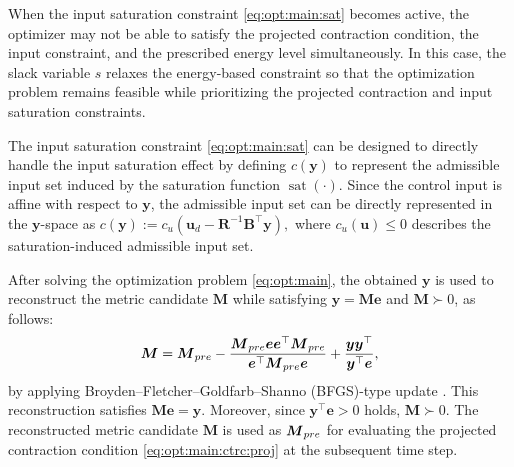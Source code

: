 \documentclass{ifacconf}
\newcommand*{\mv}[1]{\boldsymbol{#1}} %
\newcommand*{\mm}[1]{\boldsymbol{#1}} %
\newcommand*{\norm}[1]{\lVert #1 \rVert} %
\DeclareMathOperator{\mysat}{{sat}}       %
\DeclareMathOperator{\mydiag}{{diag}}     %
\begin{document}
When the input saturation constraint \eqref{eq:opt:main:sat} becomes active, the optimizer may not be able to satisfy the projected contraction condition, the input constraint, and the prescribed energy level simultaneously.
In this case, the slack variable $s$ relaxes the energy-based constraint so that the optimization problem remains feasible while prioritizing the projected contraction and input saturation constraints.

The input saturation constraint \eqref{eq:opt:main:sat} can be designed to directly handle the input saturation effect by defining $c(\mv{y})$ to represent the admissible input set induced by the saturation function $\mysat(\cdot)$.
Since the control input is affine with respect to $\mv y$, the admissible input set can be directly represented in the $\mv y$-space as
$
   c(\mv y):=
   c_u\left(\mv u_d-\mm R^{-1}\mm B^\top\mv y\right),
$
where $c_u(\mv u)\le0$ describes the saturation-induced admissible input set.

After solving the optimization problem \eqref{eq:opt:main}, the obtained $\mv{y}$ is used to reconstruct the metric candidate $\mm{M}$ while satisfying $\mv{y}=\mm{M}\mv{e}$ and $\mm{M}\succ0$, as follows:
\begin{equation} \label{eq:retrive:mm}
   \mm{M}
   =
   \mm{M}_{\rm{pre}}
   -
   \frac{
      \mm{M}_{\rm{pre}}
      \mv{e}\mv{e}^\top
      \mm{M}_{\rm{pre}}
   }{
      \mv{e}^\top
      \mm{M}_{\rm{pre}}
      \mv{e}
   }
   +
   \frac{\mv{y}\mv{y}^\top}{\mv{y}^\top\mv{e}}
   ,
\end{equation}
by applying Broyden--Fletcher--Goldfarb--Shanno (BFGS)-type update \citep{Nocedal:2006aa}.%
This reconstruction satisfies $\mm{M}\mv{e}=\mv{y}$. 
Moreover, since $\mv{y}^\top\mv{e}>0$ holds, $\mm{M}\succ0$.
The reconstructed metric candidate $\mm{M}$ is used as $\mm{M}_{\rm{pre}}$ for evaluating the projected contraction condition \eqref{eq:opt:main:ctrc:proj} at the subsequent time step.
\end{document}
